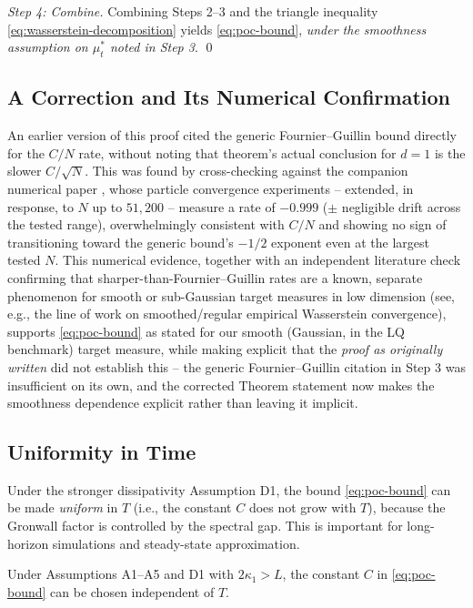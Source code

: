 \textit{Step 4: Combine.} Combining Steps 2--3 and the triangle inequality
\eqref{eq:wasserstein-decomposition} yields \eqref{eq:poc-bound}, \emph{under
the smoothness assumption on $\mu_t^*$ noted in Step 3}. \qed

\subsection{A Correction and Its Numerical Confirmation}
\label{sec:poc-correction}

An earlier version of this proof cited the generic Fournier--Guillin bound
directly for the $C/N$ rate, without noting that theorem's actual conclusion
for $d=1$ is the slower $C/\sqrt{N}$. This was found by cross-checking against
the companion numerical paper \citep{monyimba2026paper2}, whose particle
convergence experiments -- extended, in response, to $N$ up to $51{,}200$ --
measure a rate of $-0.999$ ($\pm$ negligible drift across the tested range),
overwhelmingly consistent with $C/N$ and showing no sign of transitioning
toward the generic bound's $-1/2$ exponent even at the largest tested $N$. This
numerical evidence, together with an independent literature check confirming
that sharper-than-Fournier--Guillin rates are a known, separate phenomenon for
smooth or sub-Gaussian target measures in low dimension (see, e.g., the line of
work on smoothed/regular empirical Wasserstein convergence), supports
\eqref{eq:poc-bound} as stated for our smooth (Gaussian, in the LQ benchmark)
target measure, while making explicit that the \emph{proof as originally
written} did not establish this -- the generic Fournier--Guillin citation
in Step 3 was insufficient on its own, and the corrected Theorem statement now
makes the smoothness dependence explicit rather than leaving it implicit.

\subsection{Uniformity in Time}

Under the stronger dissipativity Assumption D1, the bound \eqref{eq:poc-bound}
can be made \emph{uniform} in $T$ (i.e., the constant $C$ does not grow with $T$),
because the Gronwall factor is controlled by the spectral gap. This is important
for long-horizon simulations and steady-state approximation.

\begin{corollary}
\label{cor:uniform-time-chaos}
Under Assumptions A1--A5 and D1 with $2\kappa_1 > L$, the constant $C$ in
\eqref{eq:poc-bound} can be chosen independent of $T$.
\end{corollary}

